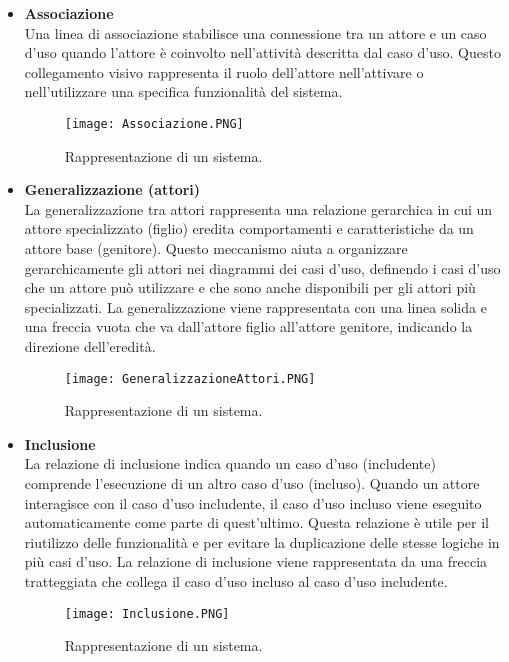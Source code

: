 \begin{itemize}
        \item \textbf{Associazione}\\
        Una linea di associazione stabilisce una connessione tra un attore e un caso d'uso quando l'attore è coinvolto nell'attività descritta dal caso d'uso. Questo collegamento visivo rappresenta il ruolo dell'attore nell'attivare o nell'utilizzare una specifica funzionalità del sistema.
        \begin{figure}[H]
        \centering
        \texttt{[image: Associazione.PNG]}
        \caption{Rappresentazione di un sistema.}
        \end{figure}

        \item \textbf{Generalizzazione (attori)}\\
        La generalizzazione tra attori rappresenta una relazione gerarchica in cui un attore specializzato (figlio) eredita comportamenti e caratteristiche da un attore base (genitore). Questo meccanismo aiuta a organizzare gerarchicamente gli attori nei diagrammi dei casi d’uso, definendo i casi d'uso che un attore può utilizzare e che sono anche disponibili per gli attori più specializzati. La generalizzazione viene rappresentata con una linea solida e una freccia vuota che va dall'attore figlio all'attore genitore, indicando la direzione dell'eredità.
        \begin{figure}[H]
        \centering
        \texttt{[image: GeneralizzazioneAttori.PNG]}
        \caption{Rappresentazione di un sistema.}
        \end{figure}

        \item \textbf{Inclusione}\\
        La relazione di inclusione indica quando un caso d'uso (includente) comprende l'esecuzione di un altro caso d'uso (incluso). Quando un attore interagisce con il caso d'uso includente, il caso d'uso incluso viene eseguito automaticamente come parte di quest'ultimo. Questa relazione è utile per il riutilizzo delle funzionalità e per evitare la duplicazione delle stesse logiche in più casi d'uso. La relazione di inclusione viene rappresentata da una freccia tratteggiata che collega il caso d'uso incluso al caso d'uso includente.
        \begin{figure}[H]
        \centering
        \texttt{[image: Inclusione.PNG]}
        \caption{Rappresentazione di un sistema.}
        \end{figure}


\end{itemize}
